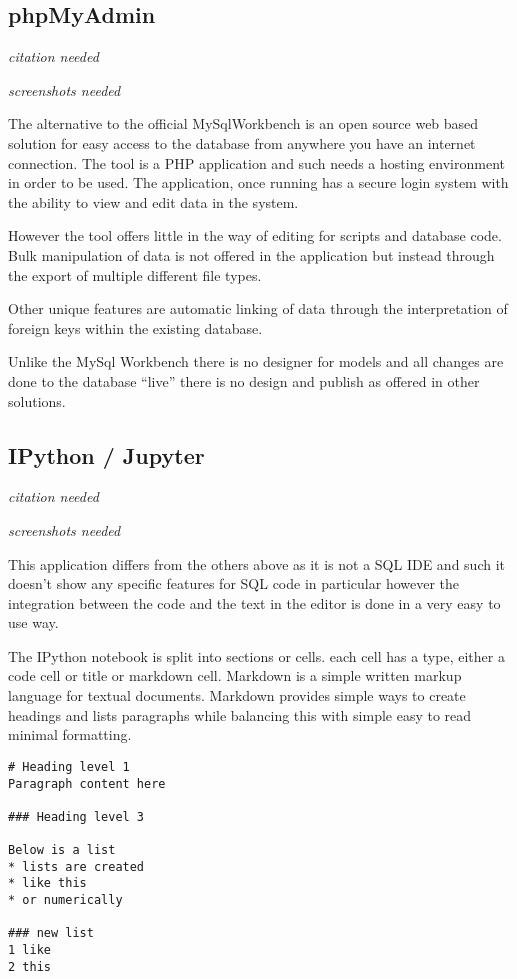 \subsection{phpMyAdmin}\label{phpmyadmin}

\emph{citation needed}

\emph{screenshots needed}

The alternative to the official MySqlWorkbench is an open source web
based solution for easy access to the database from anywhere you have an
internet connection. The tool is a PHP application and such needs a
hosting environment in order to be used. The application, once running
has a secure login system with the ability to view and edit data in the
system.

However the tool offers little in the way of editing for scripts and
database code. Bulk manipulation of data is not offered in the
application but instead through the export of multiple different file
types.

Other unique features are automatic linking of data through the
interpretation of foreign keys within the existing database.

Unlike the MySql Workbench there is no designer for models and all
changes are done to the database ``live'' there is no design and publish
as offered in other solutions.

\subsection{IPython / Jupyter}\label{ipython-jupyter}

\emph{citation needed}

\emph{screenshots needed}

This application differs from the others above as it is not a SQL IDE
and such it doesn't show any specific features for SQL code in
particular however the integration between the code and the text in the
editor is done in a very easy to use way.

The IPython notebook is split into sections or cells. each cell has a
type, either a code cell or title or markdown cell. Markdown is a simple
written markup language for textual documents. Markdown provides simple
ways to create headings and lists paragraphs while balancing this with
simple easy to read minimal formatting.

\begin{verbatim}
# Heading level 1
Paragraph content here

### Heading level 3

Below is a list
* lists are created
* like this
* or numerically

### new list
1 like
2 this
\end{verbatim}

